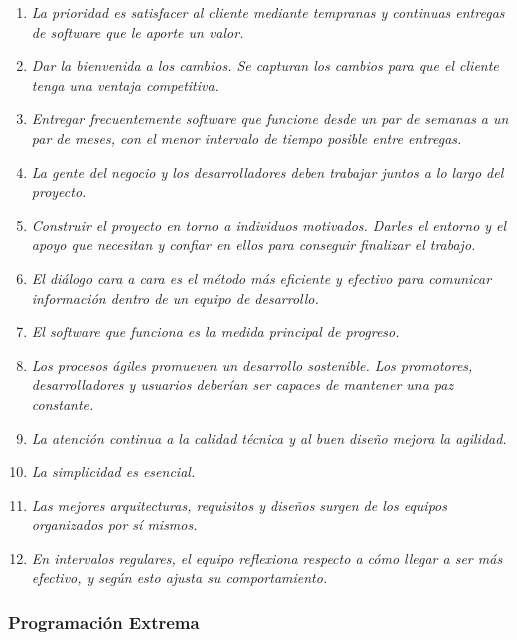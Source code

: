       \begin{enumerate}
        \item {\it La prioridad es satisfacer al cliente mediante tempranas y continuas entregas de software que le aporte un valor.}
        \item {\it Dar la bienvenida a los cambios. Se capturan los cambios para que el cliente tenga una ventaja competitiva.}
        \item {\it Entregar frecuentemente software que funcione desde un par de semanas a un par de meses, con el menor intervalo de tiempo posible entre entregas.}
        \item {\it La gente del negocio y los desarrolladores deben trabajar juntos a lo largo del proyecto.}
        \item {\it Construir el proyecto en torno a individuos motivados. Darles el entorno y el apoyo que necesitan y confiar en ellos para conseguir finalizar el trabajo.}
        \item {\it El diálogo cara a cara es el método más eficiente y efectivo para comunicar información dentro de un equipo de desarrollo.}
        \item {\it El software que funciona es la medida principal de progreso.}
        \item {\it Los procesos ágiles promueven un desarrollo sostenible. Los promotores, desarrolladores y usuarios deberían ser capaces de mantener una paz constante.}
        \item {\it La atención continua a la calidad técnica y al buen diseño mejora la agilidad.}
        \item {\it La simplicidad es esencial.}
        \item {\it Las mejores arquitecturas, requisitos y diseños surgen de los equipos organizados por sí mismos.}
        \item {\it En intervalos regulares, el equipo reflexiona respecto a cómo llegar a ser más efectivo, y según esto ajusta su comportamiento.}
      \end{enumerate}
      
    
    \subsubsection{Programación Extrema} %
    \label{ssub:programacion_extrema}
      
